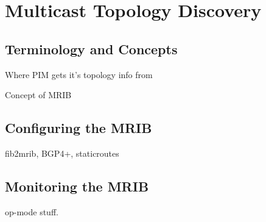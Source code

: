 \chapter{Multicast Topology Discovery}

\section{Terminology and Concepts}

Where PIM gets it's topology info from

Concept of MRIB

\section{Configuring the MRIB}

fib2mrib, BGP4+, staticroutes

\section{Monitoring the MRIB}

op-mode stuff.








